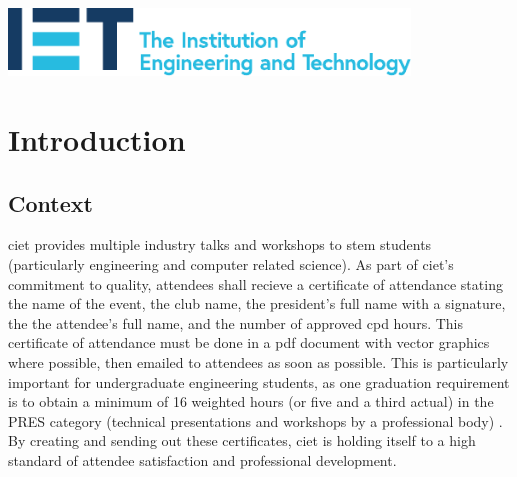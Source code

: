 \documentclass[11pt]{article}
\begin{document}
\begin{titlepage}
    
    \vfill
    \includegraphics[width=0.8\textwidth]{../../assets/IET_Logo_Blue_RGB.pdf}\\
     
    
    \vfill %
    
\end{titlepage}


\tableofcontents

\newpage

\listoffigures

\newpage

\printglossary[type=\acronymtype]

\printglossary

\newpage


\setcounter{page}{1}

\section{Introduction}

\subsection{Context}

\acrfull{ciet} provides multiple industry talks and workshops to \acrshort{stem} students (particularly engineering and computer related science). As part of \acrshort{ciet}'s commitment to quality, attendees shall recieve a certificate of attendance stating the name of the event, the club name, the president's full name with a signature, the the attendee's full name, and the number of approved \acrshort{cpd} hours. This certificate of attendance must be done in a \acrshort{pdf} document with vector graphics where possible, then emailed to attendees as soon as possible. This is particularly important for undergraduate engineering students, as one graduation requirement is to obtain a minimum of 16 weighted hours (or five and a third actual) in the PRES category (technical presentations and workshops by a professional body) \cite{eng-logbook}. By creating and sending out these certificates, \acrshort{ciet} is holding itself to a high standard of attendee satisfaction and professional development.
\end{document}
